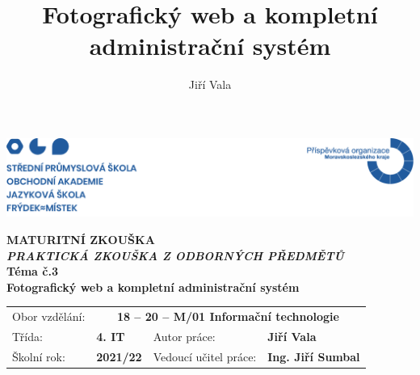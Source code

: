 \documentclass[12pt,a4paper]{report}
\title{Fotografický web a kompletní administrační systém}
\author{Jiří Vala}
\date{}
\begin{document}
\renewcommand*\listfigurename{}
\renewcommand{\figurename}{Obr.}
\renewcommand\refname{}
\renewcommand{\contentsname}{\color{pojblue}Obsah}



\begin{titlepage}
  \begin{adjustwidth}{-20mm}{-7.5mm} 
		\vspace*{-1.5cm}
		\noindent\includegraphics[width=\linewidth]{header.png}
	\end{adjustwidth}
	\begin{center}
		\vspace*{0.2cm}
    \color{pojblue}
		\Huge\textbf{MATURITNÍ ZKOUŠKA}
    \color{black}
    \vspace*{1cm} \\
		\large\emph{\textbf{PRAKTICKÁ ZKOUŠKA Z ODBORNÝCH PŘEDMĚTŮ}}
		\vspace*{1cm} \\
    \color{pojblue}
		\Large \textbf{Téma č.3} \\
    \vspace*{1cm}
		\Large \textbf{Fotografický web a kompletní administrační systém} \\
    \color{black}
		\vfill
		\normalsize
	\end{center}
	\begin{tabularx}{\textwidth}{l@{\hskip 0.5cm}XXl}
		Obor vzdělání: & \multicolumn{3}{c}{\textbf{18 – 20 – M/01 Informační technologie}} \\[10pt]
		Třída: & \textbf{4. IT} & Autor práce: & \textbf{Jiří Vala} \\[10pt]
		Školní rok: & \textbf{2021/22} & Vedoucí učitel práce: & \textbf{Ing. Jiří Sumbal}
		\vspace*{1cm}
	\end{tabularx}
\end{titlepage}

  \color{pojblue}
\end{document}
